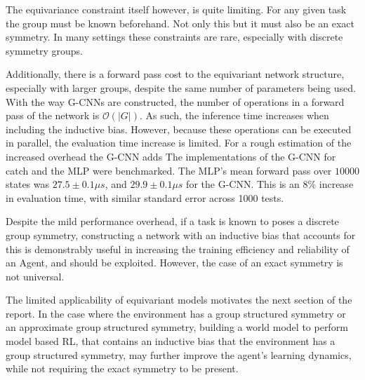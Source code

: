 The equivariance constraint itself however, is quite limiting. For any given task the group must be known beforehand. Not only this but it must also be an exact symmetry. In many settings these constraints are rare, especially with discrete symmetry groups.

Additionally, there is a forward pass cost to the equivariant network structure, especially with larger groups, despite the same number of parameters being used. With the way G-CNNs are constructed, the number of operations in a forward pass of the network is $\mathcal{O}(|G|)$. As such, the inference time increases when including the inductive bias. However, because these operations can be executed in parallel, the evaluation time increase is limited. For a rough estimation of the increased overhead the G-CNN adds The implementations of the G-CNN for catch and the MLP were benchmarked. The MLP's mean forward pass over $10000$ states was $27.5 \pm 0.1\mu s$, and $29.9 \pm 0.1 \mu s$ for the G-CNN. This is an $8\%$ increase in evaluation time, with similar standard error across 1000 tests.

Despite the mild performance overhead, if a task is known to poses a discrete group symmetry, constructing a network with an inductive bias that accounts for this is demonstrably useful in increasing the training efficiency and reliability of an Agent, and should be exploited. However, the case of an exact symmetry is not universal.

The limited applicability of equivariant models motivates the next section of the report. In the case where the environment has a group structured symmetry or an approximate group structured symmetry, building a world model to perform model based RL, that contains an inductive bias that the environment has a group structured symmetry, may further improve the agent's learning dynamics, while not requiring the exact symmetry to be present.


